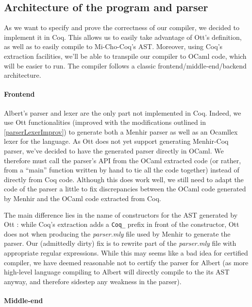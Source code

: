 \documentclass{report}
\begin{document}
\subsection{Architecture of the program and parser}

As we want to specify and prove the correctness of our compiler, we decided to implement it in Coq. This allows us to easily take advantage of Ott's definition, as well as to easily compile to Mi-Cho-Coq's AST. Moreover, using Coq's extraction facilities, we'll be able to transpile our compiler to OCaml code, which will be easier to run. The compiler follows a classic frontend/middle-end/backend architecture.

\paragraph{Frontend}

Albert's parser and lexer are the only part not implemented in Coq. Indeed, we use Ott functionalities (improved with the modifications outlined in \ref{parserLexerImprov}) to generate both a Menhir parser as well as an Ocamllex lexer for the language. As Ott does not yet support generating Menhir-Coq parser, we've decided to have the generated parser directly in OCaml. We therefore must call the parser's API from the OCaml extracted code (or rather, from a ``main'' function written by hand to tie all the code together) instead of directly from Coq code. Although this does work well, we still need to adapt the code of the parser a little to fix discrepancies between the OCaml code generated by Menhir and the OCaml code extracted from Coq.

The main difference lies in the name of constructors for the AST generated by Ott : while Coq's extraction adds a \texttt{Coq\_} prefix in front of the constructor, Ott does not when producing the \textit{parser.mly} file used by Menhir to generate the parser. Our (admittedly dirty) fix is to rewrite part of the \textit{parser.mly} file with appropriate regular expressions. While this may seems like a bad idea for certified compiler, we have deemed reasonable not to certify the parser for Albert (as more high-level language compiling to Albert will directly compile to the its AST anyway, and therefore sidestep any weakness in the parser).

\paragraph{Middle-end}
\end{document}
